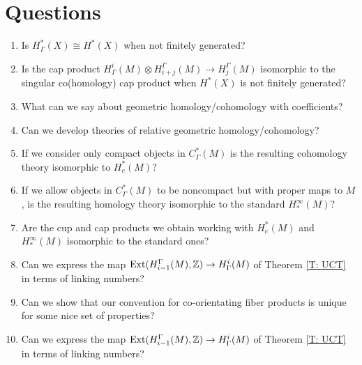 
\section{Questions}

\begin{enumerate}
	\item Is $H^*_\Gamma(X)\cong H^*(X)$ when not finitely generated?

	\item Is the cap product $H^i_\Gamma(M)\otimes H_{i+j}^\Gamma(M)\to H^\Gamma_j(M)$ isomorphic to the singular co(homology) cap product when $H^*(X)$ is not finitely generated?

	\begin{comment}
		\item For a closed oriented $M^m$, is the Poincar\'e duality map $H^i_\Gamma(M)\to H_{m-i}^\Gamma(M)$ that takes a cochain to a chain simply by converting the co-orientation to an orientation (via our standard construction over oriented manifolds) isomorphic to the singular co(homology) cap product with the fundamental class via the isomorphisms of homology and cohomology groups we have developed.
	\end{comment}

	\item What can we say about geometric homology/cohomology with coefficients?

	\item Can we develop theories of relative geometric homology/cohomology?

	\item If we consider only compact objects in $C_\Gamma^*(M)$ is the resulting cohomology theory isomorphic to $H^*_c(M)$?

	\item If we allow objects in $C^*_\Gamma(M)$ to be noncompact but with proper maps to $M$, is the resulting homology theory isomorphic to the standard $H^\infty_*(M)$?

	\item Are the cup and cap products we obtain working with $H^*_c(M)$ and $H^\infty_*(M)$ isomorphic to the standard ones?

	\item Can we express the map $\text{Ext}(H_{i-1}^\Gamma(M),\mathbb{Z}) \to H^i_\Gamma(M)$ of Theorem \ref{T: UCT} in terms of linking numbers?

	\item Can we show that our convention for co-orientating fiber products is unique for some nice set of properties?

	\item Can we express the map $\text{Ext}(H_{i-1}^\Gamma(M),\mathbb{Z})\to H^i_\Gamma(M)$ of Theorem \ref{T: UCT} in terms of linking numbers?

\end{enumerate}